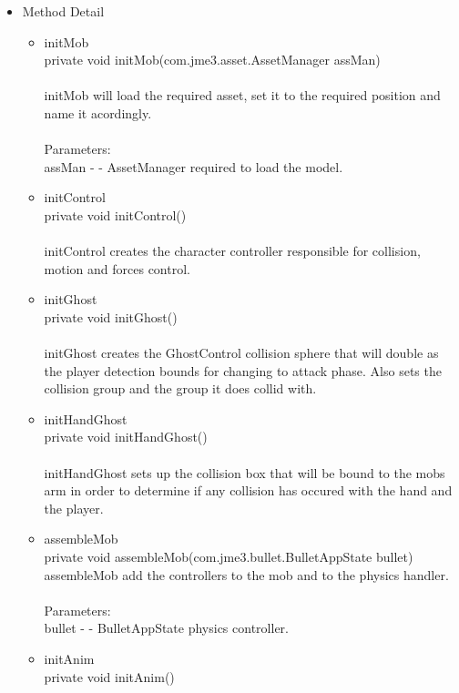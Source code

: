 \documentclass[letterpaper]{article}
\begin{document}
\begin{itemize}
						\item	Method Detail
								\begin{itemize}
									\item	initMob \\
											private void initMob(com.jme3.asset.AssetManager assMan) \\ \\
											initMob will load the required asset, set it to the required position and name it acordingly. \\ \\
											Parameters: \\
											assMan - - AssetManager required to load the model.
									\item	initControl \\
											private void initControl() \\ \\
											initControl creates the character controller responsible for collision, motion and forces control.
									\item	initGhost \\
											private void initGhost() \\ \\
											initGhost creates the GhostControl collision sphere that will double as the player detection bounds for changing to attack phase. Also sets the collision group and the group it does collid with.
									\item	initHandGhost \\
											private void initHandGhost() \\ \\
											initHandGhost sets up the collision box that will be bound to the mobs arm in order to determine if any collision has occured with the hand and the player.
									\item	assembleMob \\
											private void assembleMob(com.jme3.bullet.BulletAppState bullet) \\
											assembleMob add the controllers to the mob and to the physics handler. \\ \\
											Parameters: \\
											bullet - - BulletAppState physics controller.
									\item	initAnim \\
											private void initAnim() \\ \\

\end{itemize}
\end{itemize}
\end{document}
